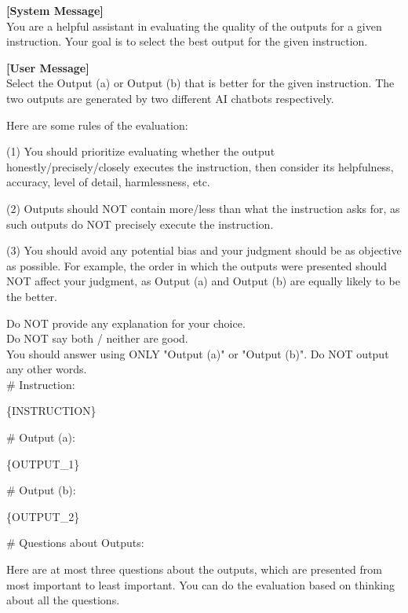 \begin{figure*}[t!]
\begin{tcolorbox}[colback=black!3!white, colframe=black!70!white, title=Metric + Reference, fontupper=\footnotesize, fonttitle=\footnotesize]
\textbf{[System Message]} \\
You are a helpful assistant in evaluating the quality of the outputs for a given instruction. Your goal is to select the best output for the given instruction.
\newline

\textbf{[User Message]}\\
Select the Output (a) or Output (b) that is better for the given instruction. The two outputs are generated by two different AI chatbots respectively.
\newline

Here are some rules of the evaluation:

(1) You should prioritize evaluating whether the output honestly/precisely/closely executes the instruction, then consider its helpfulness, accuracy, level of detail, harmlessness, etc.

(2) Outputs should NOT contain more/less than what the instruction asks for, as such outputs do NOT precisely execute the instruction.

(3) You should avoid any potential bias and your judgment should be as objective as possible. For example, the order in which the outputs were presented should NOT affect your judgment, as Output (a) and Output (b) are equally likely to be the better.
\newline

Do NOT provide any explanation for your choice. \\
Do NOT say both / neither are good. \\
You should answer using ONLY "Output (a)" or "Output (b)". Do NOT output any other words.\\

\# Instruction:

\{INSTRUCTION\}
\newline

\# Output (a):

\{OUTPUT\_1\}
\newline

\# Output (b):

\{OUTPUT\_2\}
\newline

\# Questions about Outputs:

Here are at most three questions about the outputs, which are presented from most important to least important. You can do the evaluation based on thinking about all the questions.


\end{tcolorbox}
\end{figure*}
